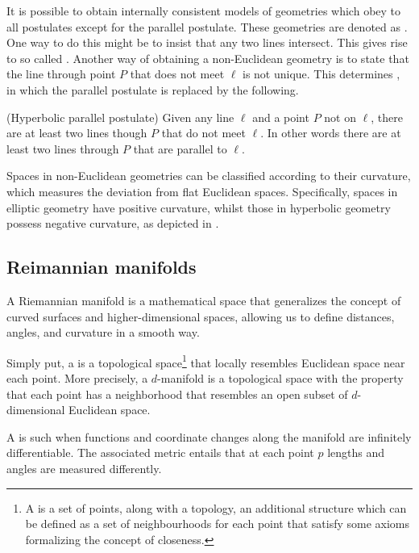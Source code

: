 It is possible to obtain internally consistent models of geometries which obey to all postulates except for the parallel postulate. These geometries are denoted as . One way to do this might be to insist that any two lines intersect. This gives rise to so called . Another way of obtaining a non-Euclidean geometry is to state that the line through point $P$ that does not meet $\ell$ is not unique. This determines , in which the parallel postulate is replaced by the following.


\begin{postulate}(Hyperbolic parallel postulate)
    Given any line $\ell$ and a point $P$ not on $\ell$, there are at least two lines though $P$ that do not meet $\ell$. In other words there are at least two lines through $P$ that are parallel to $\ell$.
\end{postulate}



Spaces in non-Euclidean geometries can be classified according to their curvature, which measures the deviation from flat Euclidean spaces. Specifically, spaces in elliptic geometry have positive curvature, whilst those in hyperbolic geometry possess negative curvature, as depicted in . 

\subsection{Reimannian manifolds}
A Riemannian manifold is a mathematical space that generalizes the concept of curved surfaces and higher-dimensional spaces, allowing us to define distances, angles, and curvature in a smooth way. 

Simply put, a  is a topological space\footnote{A  is a set of points, along with a topology, an additional structure which can be defined as a set of neighbourhoods for each point that satisfy some axioms formalizing the concept of closeness.} that locally resembles Euclidean space near each point. More precisely, a $d$-manifold  is a topological space with the property that each point has a neighborhood that resembles an open subset of $d$-dimensional Euclidean space. 

A  is such when functions and coordinate changes along the manifold are infinitely differentiable. The associated metric entails that at each point $p$ lengths and angles are measured differently. 

